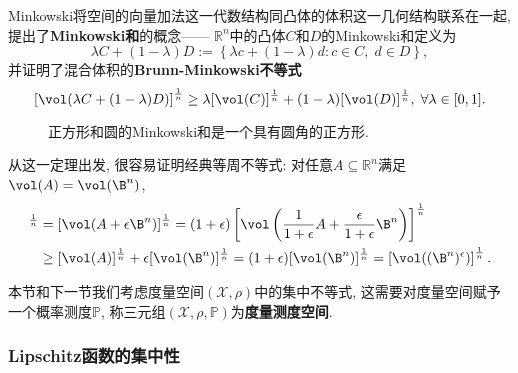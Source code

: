 Minkowski将空间的向量加法这一代数结构同凸体的体积这一几何结构联系在一起, 提出了\textbf{Minkowski和}的概念——
$\mathbb{R}^n$中的凸体$C$和$D$的Minkowski和定义为
\begin{equation*}
	\lambda C + (1 - \lambda) D := \left\{ \lambda c + (1 - \lambda) d \colon c \in C,\; d \in D \right\}, 
\end{equation*}
并证明了混合体积的\textbf{Brunn-Minkowski不等式}
\begin{equation*}
	\left[ \vol(\lambda C + (1-\lambda) D)  \right]^{\frac1n}
	\geq \lambda [\vol(C)]^{\frac1n} + (1-\lambda) [\vol(D)]^{\frac1n},\;
	\forall \lambda \in [0,1]. 
\end{equation*}
\begin{figure}[H]
	\centering
	\caption{正方形和圆的Minkowski和是一个具有圆角的正方形.}
\end{figure}
从这一定理出发, 很容易证明经典等周不等式: 对任意$A \subseteq \mathbb{R}^n$满足$\vol(A) = \vol(\B^n)$, 
\begin{align*}
	[\vol(A^{\epsilon})]^{\frac1n}
	&= [\vol(A + \epsilon \B^n)]^{\frac1n}
	= (1+\epsilon) \left[\vol\left(\frac{1}{1+\epsilon} A + \frac{\epsilon}{1+\epsilon} \B^n\right)\right]^{\frac1n} \\
	&\geq [\vol(A)]^{\frac1n} + \epsilon [\vol(\B^n)]^{\frac1n} 
	= (1+\epsilon) [\vol(\B^n)]^{\frac1n} 
	= \left[ \vol((\B^n)^{\epsilon}) \right]^{\frac1n}. 
\end{align*}


本节和下一节我们考虑度量空间$(\mathcal{X}, \rho)$中的集中不等式, 这需要对度量空间赋予一个概率测度$\mathbb{P}$, 称三元组$(\mathcal{X}, \rho, \mathbb{P})$为\textbf{度量测度空间}. 

\subsubsection{Lipschitz函数的集中性}

